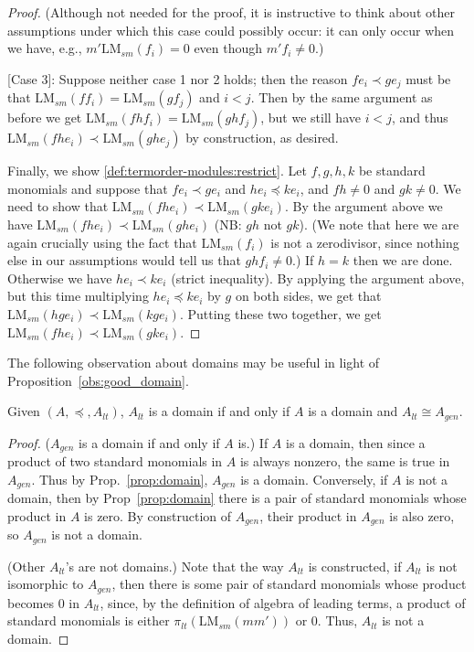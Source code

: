 \documentclass[11pt,reqno]{amsart}
\newcommand{\lmsm}{\text{LM}_{sm}}
\theoremstyle{definition}
\numberwithin{equation}{section}
\begin{document}
\begin{proof}
(Although not needed for the proof, it is instructive to think about other assumptions under which this case could possibly occur: it can only occur when we have, e.g., $m' \lmsm(f_i) = 0$ even though $m' f_i \neq 0$.)

[Case 3]: Suppose neither case 1 nor 2 holds; then the reason $fe_i \prec g e_j$ must be that $\lmsm(ff_i) = \lmsm(g f_j)$ and $i < j$. Then by the same argument as before we get $\lmsm (f h f_i) = \lmsm(g h f_j)$, but we still have $i < j$, and thus $\lmsm(fh e_i) \prec \lmsm( gh e_j)$ by construction, as desired.

Finally, we show \ref{def:termorder-modules:restrict}. Let $f,g,h,k$ be standard monomials and suppose that $f e_i \prec g e_i$ and $h e_i \preceq k e_i$, and $fh \neq 0$ and $gk \neq 0$. We need to show that $\lmsm(f h e_i) \prec \lmsm(g k e_i)$. By the argument above we have $\lmsm(f h e_i) \prec \lmsm (g h e_i)$ (NB: $gh$ not $gk$). (We note that here we are again crucially using the fact that $\lmsm(f_i)$ is not a zerodivisor, since nothing else in our assumptions would tell us that $gh f_i \neq 0$.) If $h=k$ then we are done. Otherwise we have $h e_i \prec k e_i$ (strict inequality). By applying the argument above, but this time multiplying $h e_i \preceq k e_i$ by $g$ on both sides, we get that $\lmsm(hg e_i) \prec \lmsm( kg e_i)$. Putting these two together, we get $\lmsm( f h e_i) \prec \lmsm(g k e_i)$. 
\end{proof}

The following observation about domains may be useful in light of Proposition~\ref{obs:good_domain}.

\begin{observation} \label{obs:alt-domain}
Given $(A,\preceq, A_{lt})$, $A_{lt}$ is a domain if and only if $A$ is a domain and $A_{lt} \cong A_{gen}$.
\end{observation}

\begin{proof}
($A_{gen}$ is a domain if and only if $A$ is.) If $A$ is a domain, then since a product of two standard monomials in $A$ is always nonzero, the same is true in $A_{gen}$. Thus by Prop.~\ref{prop:domain}, $A_{gen}$ is a domain. Conversely, if $A$ is not a domain, then by Prop~\ref{prop:domain} there is a pair of standard monomials whose product in $A$ is zero. By construction of $A_{gen}$, their product in $A_{gen}$ is also zero, so $A_{gen}$ is not a domain.

(Other $A_{lt}$'s are not domains.) Note that the way $A_{lt}$ is constructed, if $A_{lt}$ is not isomorphic to $A_{gen}$, then there is some pair of standard monomials whose product becomes $0$ in $A_{lt}$, since, by the definition of algebra of leading terms, a product of standard monomials is either $\pi_{lt}(\lmsm(mm'))$ or $0$. Thus, $A_{lt}$ is not a domain.
\end{proof}
\end{document}
